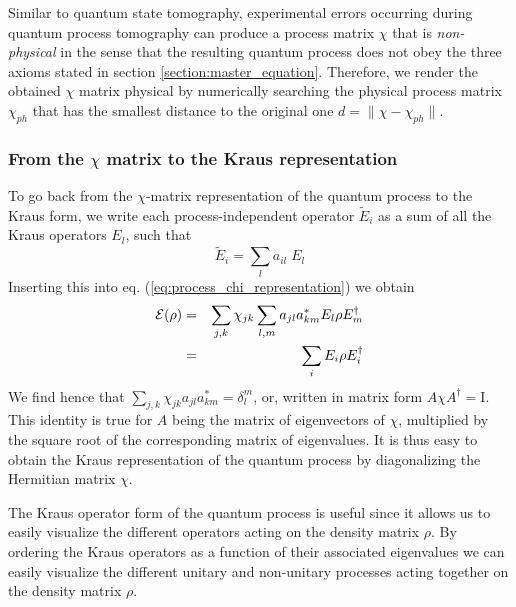\smallskip

Similar to quantum state tomography, experimental errors occurring during quantum process tomography can produce a process matrix $\chi$ that is {\it non-physical} in the sense that the resulting quantum process does not obey the three axioms stated in section \ref{section:master_equation}. Therefore, we render the obtained $\chi$ matrix physical by numerically searching the  physical process matrix $\chi_{ph}$ that has the smallest distance to the original one $d=\|\chi-\chi_{ph}\|$.

\subsubsection{From the $\chi$ matrix to the Kraus representation}

To go back from the $\chi$-matrix representation of the quantum process to the Kraus form, we write each process-independent operator $\tilde{E}_i$ as a sum of all the Kraus operators $E_l$, such that
%
\begin{equation}
	\tilde{E}_i = \sum\limits_l a_{il}\; E_l
\end{equation}
%
Inserting this into eq. (\ref{eq:process_chi_representation}) we obtain
%
\begin{eqnarray}
\begin{mathcal}E\end{mathcal}(\rho) & = & \sum\limits_{j,k}\chi_{jk}\sum\limits_{l,m} a_{jl}a_{km}^* E_l \rho E_m^\dagger   \label{eq:process_chi_transformed} \\
& = & \sum\limits_i E_i \rho E^\dagger_i
\end{eqnarray}
%
We find hence that $\sum\limits_{j,k} \chi_{jk}a_{jl}a_{km}^* = \delta_l^m$, or, written in matrix form $A\chi A^\dagger = \mathrm{I}$. This identity is true for $A$ being the matrix of eigenvectors of $\chi$, multiplied by the square root of the corresponding matrix of eigenvalues. It is thus easy to obtain the Kraus representation of the quantum process by diagonalizing the Hermitian matrix $\chi$.

\smallskip

The Kraus operator form of the quantum process is useful since it allows us to easily visualize the different operators acting on the density matrix $\rho$. By ordering the Kraus operators as a function of their associated eigenvalues we can easily visualize the different unitary and non-unitary processes acting together on the density matrix $\rho$.

